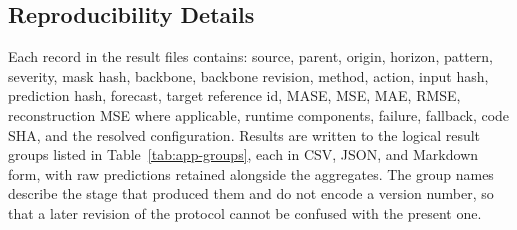 \documentclass{article}
\begin{document}
\begin{table}[htbp]
  \caption{Backbone call accounting. Latency is reported per request and excludes cold start,
  which is reported on its own line. The offline replay-bank build and the one-off selector fit
  are amortised and reported separately. Candidate materialisation and scoring are booked on
  their own line and are not forecasting-backbone calls.}
  \label{tab:app-calls}
  \centering
  \small
  \setlength{\tabcolsep}{4pt}
\end{table}

\subsection{Reproducibility Details}
\label{app:reprodetails}
Each record in the result files contains: source, parent, origin, horizon, pattern,
severity, mask hash, backbone, backbone revision, method, action, input hash, prediction
hash, forecast, target reference id, MASE, MSE, MAE, RMSE, reconstruction MSE where
applicable, runtime components, failure, fallback, code SHA, and the resolved configuration.
Results are written to the logical result groups listed in Table~\ref{tab:app-groups}, each in
CSV, JSON, and Markdown form, with raw predictions retained alongside the aggregates. The
group names describe the stage that produced them and do not encode a version number, so that
a later revision of the protocol cannot be confused with the present one.
\end{document}
